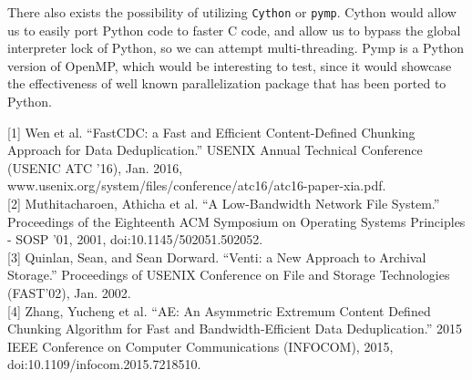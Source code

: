 \documentclass{acmtog} %
\begin{document}
	There also exists the possibility of utilizing \texttt{Cython} or \texttt{pymp}. Cython would allow us to easily port Python code to faster C code, and allow us to bypass the global interpreter lock of Python, so we can attempt multi-threading. Pymp is a Python version of OpenMP, which would be interesting to test, since it would showcase the effectiveness of well known parallelization package that has been ported to Python. 
	  \begin{thebibliography}{1}
	  
	   [1] Wen et al. “FastCDC: a Fast and Efficient Content-Defined Chunking Approach for Data Deduplication.” USENIX Annual Technical Conference (USENIC ATC ’16), Jan. 2016, www.usenix.org/system/files/conference/atc16/atc16-paper-xia.pdf. \\

	   [2] Muthitacharoen, Athicha et al. “A Low-Bandwidth Network File System.” Proceedings of the Eighteenth ACM Symposium on Operating Systems Principles - SOSP '01, 2001, doi:10.1145/502051.502052. \\

	   [3] Quinlan, Sean, and Sean Dorward. “Venti: a New Approach to Archival Storage.” Proceedings of USENIX Conference on File and Storage Technologies (FAST’02), Jan. 2002. \\

	   [4] Zhang, Yucheng et al. “AE: An Asymmetric Extremum Content Defined Chunking Algorithm for Fast and Bandwidth-Efficient Data Deduplication.” 2015 IEEE Conference on Computer Communications (INFOCOM), 2015, doi:10.1109/infocom.2015.7218510. \\

	  \end{thebibliography}

	
		
	
\end{document}
